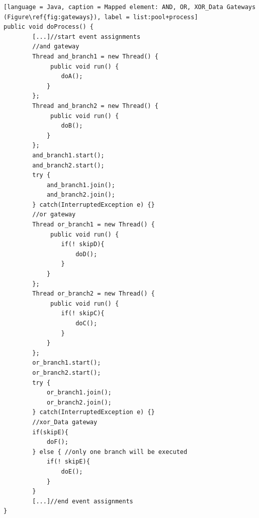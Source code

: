 \begin{lstlisting}[language = Java, caption = Mapped element: AND, OR, XOR_Data Gateways (Figure\ref{fig:gateways}), label = list:pool+process]
public void doProcess() {
		[...]//start event assignments
		//and gateway
		Thread and_branch1 = new Thread() {
			 public void run() {
				doA();
			}
		};
		Thread and_branch2 = new Thread() {
			 public void run() {
				doB();
			}
		};
		and_branch1.start();
		and_branch2.start();
		try {
			and_branch1.join();
			and_branch2.join();
		} catch(InterruptedException e) {}
		//or gateway
		Thread or_branch1 = new Thread() {
			 public void run() {
				if(! skipD){
					doD();
				}
			}
		};
		Thread or_branch2 = new Thread() {
			 public void run() {
				if(! skipC){
					doC();
				}
			}
		};
		or_branch1.start();
		or_branch2.start();
		try {
			or_branch1.join();
			or_branch2.join();
		} catch(InterruptedException e) {}
		//xor_Data gateway
		if(skipE){
			doF();
		} else { //only one branch will be executed
			if(! skipE){
				doE();
			}
		}
		[...]//end event assignments
}
\end{lstlisting}



